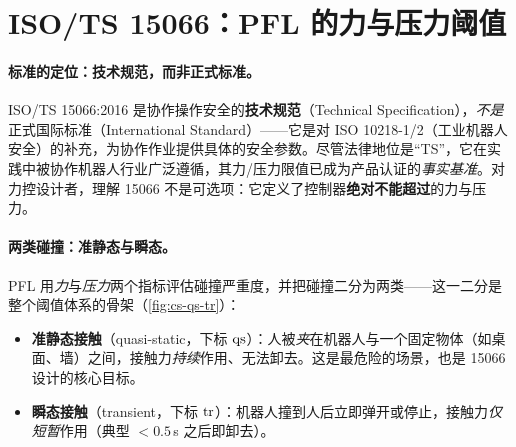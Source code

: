 \section{ISO/TS 15066：PFL 的力与压力阈值}
\label{sec:cs-iso}

\paragraph{标准的定位：技术规范，而非正式标准。}
ISO/TS 15066:2016 是协作操作安全的\textbf{技术规范}（Technical Specification），\emph{不是}正式国际标准（International Standard）——它是对 ISO 10218-1/2（工业机器人安全）的补充，为协作作业提供具体的安全参数。尽管法律地位是“TS”，它在实践中被协作机器人行业广泛遵循，其力/压力限值已成为产品认证的\emph{事实基准}。对力控设计者，理解 15066 不是可选项：它定义了控制器\textbf{绝对不能超过}的力与压力。

\paragraph{两类碰撞：准静态与瞬态。}
PFL 用\emph{力}与\emph{压力}两个指标评估碰撞严重度，并把碰撞二分为两类——这一二分是整个阈值体系的骨架（\cref{fig:cs-qs-tr}）：
\begin{itemize}
  \item \textbf{准静态接触}（quasi-static，下标 $\rm qs$）：人被\emph{夹}在机器人与一个固定物体（如桌面、墙）之间，接触力\emph{持续}作用、无法卸去。这是最危险的场景，也是 15066 设计的核心目标。
  \item \textbf{瞬态接触}（transient，下标 $\rm tr$）：机器人撞到人后立即弹开或停止，接触力\emph{仅短暂}作用（典型 $<0.5$\,s 之后即卸去）。
\end{itemize}

